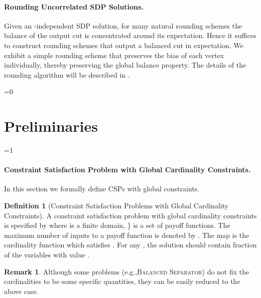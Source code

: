 \documentclass[11pt]{article}
\def\full{1}
\theoremstyle{definition}
\newtheorem{definition}[theorem]{Definition}
\newtheorem{remark}[theorem]{Remark}
\newcommand{\eg}{e.g.,\xspace}
\newcommand{\problemmacro}[1]{\texorpdfstring{\textsc{#1}}{#1}\xspace}
\newcommand{\balancedseparator}{\problemmacro{Balanced Separator}}
\numberwithin{equation}{section}
\let\origparagraph\paragraph
\renewcommand{\paragraph}[1]{\origparagraph{#1.}}
\let\pref=\prettyref
\begin{document}
\paragraph{Rounding Uncorrelated SDP Solutions}
Given an -independent SDP solution, for many natural rounding
schemes the balance of the output cut is concentrated around its
expectation.  Hence it suffices to construct rounding schemes that
output a balanced cut in expectation.  We exhibit a simple rounding
scheme that preserves the bias of each vertex individually, thereby
preserving the global balance property.   The details of the rounding algorithm will be described in \pref{sec:rounding}.

\ifnum\full=0 \vspace{-8pt}\fi
\section{Preliminaries} \label{sec:prelim}

\ifnum\full=1
\paragraph{Constraint Satisfaction Problem with Global Cardinality Constraints}

In this section we formally define CSPs with global constraints.

\begin{definition} [Constraint Satisfaction Problems with Global Cardinality Constraints]
A constraint satisfaction problem with global cardinality constraints is specified by  where  is a finite domain, \} is a set of payoff functions. The maximum number of inputs to a payoff function is denoted by . The map  is the cardinality function which satisfies . For any , the solution should contain  fraction of the variables with value .

\end{definition}
\begin{remark}
Although some problems (\eg \balancedseparator) do not fix the cardinalities to be some specific quantities, they can be easily reduced to the above case.
\end{remark}
\end{document}
